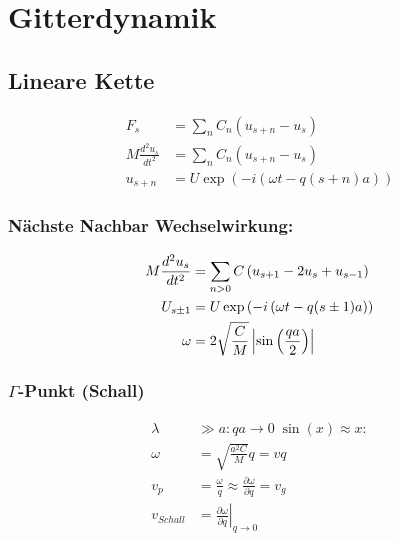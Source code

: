 \section{Gitterdynamik}


\subsection*{Lineare Kette}

\begin{equation*}
    \begin{aligned}
        F_s &= \sum_n C_n \left(u_{s+n} - u_s\right) \\
        M \frac{d^2 u_s}{dt^2} &= \sum_n C_n \left(u_{s+n} - u_s\right) \\
        u_{s+n} &= U \exp \left(-i\left(\omega t - q (s+n)a\right)\right)
    \end{aligned}
\end{equation*}

\subsubsection*{Nächste Nachbar Wechselwirkung:}
\begin{equation*}
    \begin{aligned}
        M \frac{d^2 u_s}{dt^2} &= \sum_{n>0} C \left(u_{s+1} -2u_s + u_{s-1}\right) \\
        U_{s \pm 1} &= U \exp \left(-i \left(\omega t - q (s \pm 1)a\right)\right) \\
        \omega &= 2 \sqrt{\frac{C}{M}} \left\vert\sin \left(\frac{qa}{2}\right)\right\vert
    \end{aligned}
\end{equation*}

\subsubsection*{$\Gamma$-Punkt (Schall)}
\begin{equation*}
    \begin{aligned}
        \lambda &\gg a: qa \rightarrow 0 \; \sin(x) \approx x: \\
        \omega &= \sqrt{\frac{a^2C}{M}}q = v q \\
        v_p &= \frac{\omega}{q} \approx \frac{\partial \omega}{\partial q} = v_g \\
        v_{Schall} &= \left.\frac{\partial \omega}{\partial q} \right|_{q \rightarrow 0}
    \end{aligned}
\end{equation*}

